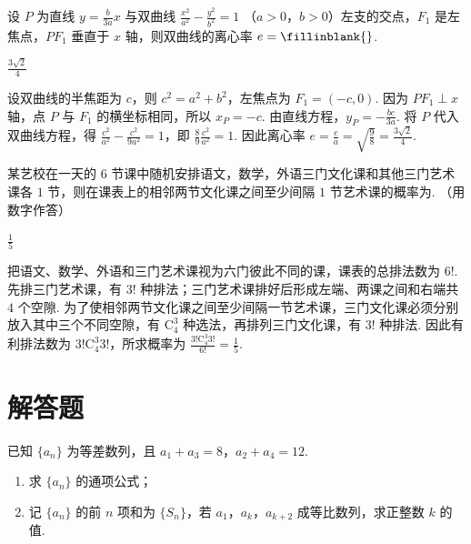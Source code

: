 \begin{problem}
设 \(P\) 为直线 \(y=\frac{b}{3a}x\) 与双曲线 \(\frac{x^2}{a^2}-\frac{y^2}{b^2}=1\) （\(a>0\)，\(b>0\)）左支的交点，\(F_1\) 是左焦点，\(PF_1\) 垂直于 \(x\) 轴，则双曲线的离心率 \(e=\fillinblank{}\).

\begin{answer}
\(\frac{3\sqrt{2}}{4}\)
\end{answer}

\begin{solution}
设双曲线的半焦距为 \(c\)，则 \(c^2=a^2+b^2\)，左焦点为 \(F_1=(-c,0)\). 因为 \(PF_1\perp x\) 轴，点 \(P\) 与 \(F_1\) 的横坐标相同，所以 \(x_P=-c\). 由直线方程，\(y_P=-\frac{bc}{3a}\). 将 \(P\) 代入双曲线方程，得 \(\frac{c^2}{a^2}-\frac{c^2}{9a^2}=1\)，即 \(\frac89\frac{c^2}{a^2}=1\). 因此离心率 \(e=\frac ca=\sqrt{\frac98}=\frac{3\sqrt2}{4}\).
\end{solution}
\end{problem}

\begin{problem}
某艺校在一天的 \(6\) 节课中随机安排语文，数学，外语三门文化课和其他三门艺术课各 \(1\) 节，则在课表上的相邻两节文化课之间至少间隔 \(1\) 节艺术课的概率为\fillinblank{}. （用数字作答）

\begin{answer}
\(\frac{1}{5}\)
\end{answer}

\begin{solution}
把语文、数学、外语和三门艺术课视为六门彼此不同的课，课表的总排法数为 \(6!\). 先排三门艺术课，有 \(3!\) 种排法；三门艺术课排好后形成左端、两课之间和右端共 \(4\) 个空隙. 为了使相邻两节文化课之间至少间隔一节艺术课，三门文化课必须分别放入其中三个不同空隙，有 \(\mathrm C_4^3\) 种选法，再排列三门文化课，有 \(3!\) 种排法. 因此有利排法数为 \(3!\mathrm C_4^3 3!\)，所求概率为 \(\frac{3!\mathrm C_4^3 3!}{6!}=\frac15\).
\end{solution}
\end{problem}

\section{解答题}

\begin{problem}
已知 \(\{a_{n}\}\) 为等差数列，且 \(a_{1}+a_{3}=8\)，\(a_{2}+a_{4}=12\).

\begin{enumerate}
\item 求 \(\{a_{n}\}\) 的通项公式；
\item 记 \(\{a_{n}\}\) 的前 \(n\) 项和为 \(\{S_{n}\}\)，若 \(a_{1}\)，\(a_{k}\)，\(a_{k+2}\) 成等比数列，求正整数 \(k\) 的值.
\end{enumerate}
\end{problem}

